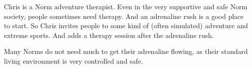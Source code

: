 \begin{npcBox}[title=Chris - a Norm adventure therapist]
    \begin{stressSection}
    \end{stressSection}
    \begin{tabularx}{\textwidth}{ XX }
    \end{tabularx}

    \begin{consequences}
    \item {}
    \item {}
    \item {}
    \end{consequences}

    \begin{npcDescription}
    Chris is a Norm adventure therapist. Even in the very supportive and safe Norm society, people sometimes need therapy. And an adrenaline rush is a good place to start.
    So Chris invites people to some kind of (often simulated) adventure and extreme sports. And adds a therapy session after the adrenaline rush.

    Many Norms do not need much to get their adrenaline flowing, as their standard living environment is very controlled and safe.
    \end{npcDescription}

\end{npcBox}

\newpage

